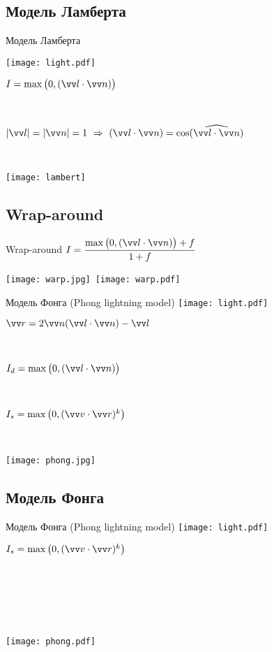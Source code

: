\documentclass[10pt]{beamer}
\begin{document}
	\subsection{Модель Ламберта}
	
	\begin{frame}{Модель Ламберта}
		
			
		{			
			\centering\texttt{[image: light.pdf]}			
			
		}
		{
			 $I=\max\big(0,(\VV l \cdot \VV n)\big)$
			 
			 ~
			
			$\abs{\VV l}=\abs{\VV n}=1 \ \Rightarrow \ (\VV l \cdot \VV n) = \cos(\widehat{\VV l \cdot \VV n})$
			
			~
			
			\centering\texttt{[image: lambert]}
		}
		
	\end{frame}
\subsection{Wrap-around}
	\begin{frame}{Wrap-around}
		\centering $I=\dfrac{\max\big(0,(\VV l \cdot \VV n)\big)+f}{1+f}$
		
		\texttt{[image: warp.jpg]}~\texttt{[image: warp.pdf]}
	\end{frame}
 
 \begin{frame}{Модель Фонга (Phong lightning model)}
 	{
 		\centering\texttt{[image: light.pdf]}	
 	}
 	{
 		$\vv r=2\VV n(\VV l \cdot \VV n) - \VV l$
 		
 		~
 		
 		$I_d=\max\big(0,(\VV l \cdot \VV n)\big)$
 		
 		~
 		
 		$I_s=\max\big(0,(\vv v \cdot \vv r)^k \big)$
 		
 		~
 		
 		\texttt{[image: phong.jpg]}
 	}
 	

 	
 \end{frame}
 \subsection{Модель Фонга}
 
  \begin{frame}{Модель Фонга (Phong lightning model)}
 	{
 		\centering\texttt{[image: light.pdf]}	
 	}
 	{
 		
 		\quad\quad\quad\quad$I_s=\max\big(0,(\vv v \cdot \vv r)^k \big)$
 		
 		~
 		
 		~
 		
 		~
 		
 		\texttt{[image: phong.pdf]}
 	}
 	\end{frame}
 	
\end{document}
